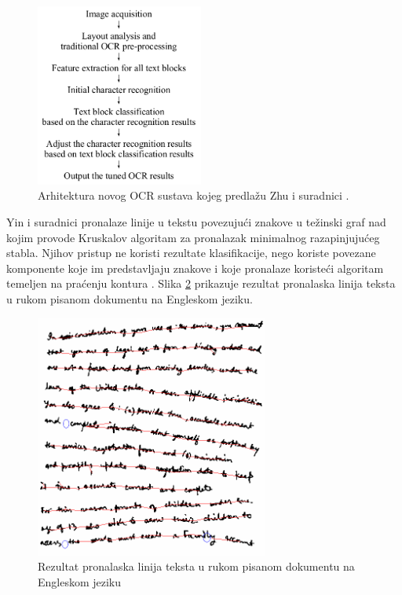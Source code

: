 \documentclass[times, utf8, zavrsni]{fer}
\begin{document}
\begin{figure}[htb]
    \centering
    \includegraphics[height=6cm]{images/novel-ocr.png}
    \caption{Arhitektura novog OCR sustava kojeg predlažu Zhu i suradnici \citep{zhu2016novel}.}
    \label{fig:novel-ocr}
\end{figure}

\pagebreak

Yin i suradnici \citep{yin2007handwritten} pronalaze linije u tekstu povezujući znakove u težinski
graf nad kojim provode Kruskalov algoritam za pronalazak minimalnog razapinjujućeg stabla. Njihov
pristup ne koristi rezultate klasifikacije, nego koriste povezane komponente koje im predstavljaju
znakove i koje pronalaze koristeći algoritam temeljen na praćenju kontura .
Slika \ref{fig:mst-example-01} prikazuje rezultat pronalaska linija teksta u rukom pisanom dokumentu na
Engleskom jeziku.

\begin{figure}[htb]
    \centering
    \includegraphics[height=8cm]{images/mst-example-01.png}
    \caption{Rezultat pronalaska linija teksta u rukom pisanom dokumentu na Engleskom jeziku \citep{yin2007handwritten}}
    \label{fig:mst-example-01}
\end{figure}
\end{document}
